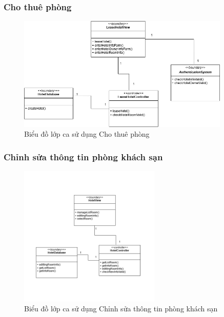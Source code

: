 \subsubsection{Cho thuê phòng}
\begin{figure}[H]
    \centering
    \includegraphics[width=0.9\textwidth]{img2.2/chothuephong.png}
    \caption{Biểu đồ lớp ca sử dụng Cho thuê phòng}
\end{figure}

\subsubsection{Chỉnh sửa thông tin phòng khách sạn}
\begin{figure}[H]
    \centering
    \includegraphics[width=0.6\textwidth]{img2.2/doithongtinphong.png}
    \caption{Biểu đồ lớp ca sử dụng Chỉnh sửa thông tin phòng khách sạn}
\end{figure}

